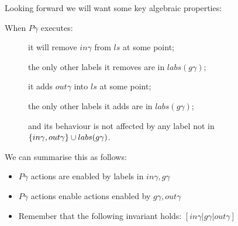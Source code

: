 Looking forward we will want some key algebraic properties:

When $P\gamma$ executes:
\begin{description}
  \item[]
    it will remove $in\gamma$ from $ls$ at some point;
  \item[]
    the only other labels it removes are in $labs(g\gamma)$;
  \item[]
    it adds $out\gamma$ into $ls$ at some point;
  \item[]
    the only other labels it adds are in $labs(g\gamma)$;
  \item[]
    and its behaviour is not affected by any label not
    in
    \\$\{in\gamma,out\gamma\} \cup labs(g\gamma)$.
\end{description}
We can summarise this as follows:
\begin{itemize}
  \item $P\gamma$ actions are enabled by labels in $in\gamma,g\gamma$
  \item $P\gamma$ actions enable actions enabled by $g\gamma,out\gamma$
  \item Remember that the following invariant holds: $[in\gamma|g\gamma|out\gamma]$
\end{itemize}




